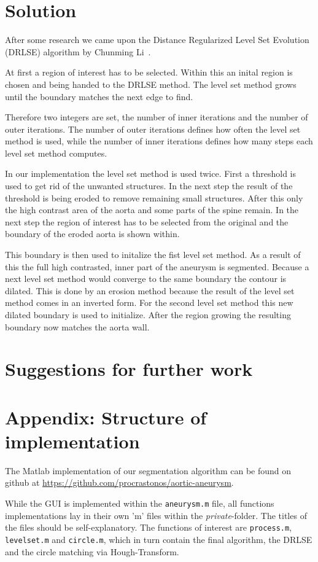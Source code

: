 \documentclass[a4paper]{scrartcl}
\begin{document}
\section*{Solution}

After some research we came upon the Distance Regularized Level Set Evolution
(DRLSE) algorithm by Chunming Li~\cite{Li_TIP08}.

At first a region of interest has to be selected. Within this an inital region is chosen and being handed to the DRLSE method.
The level set method grows until the boundary matches the next edge to find.

Therefore two integers are set, the number of inner iterations and the number of outer iterations.
The number of outer iterations defines how often the level set method is used, while the number of inner iterations defines how many steps each level set method computes.

In our implementation the level set method is used twice.
First a threshold is used to get rid of the unwanted structures.
In the next step the result of the threshold is being eroded to remove remaining small structures.
After this only the high contrast area of the aorta and some parts of the spine remain.
In the next step the region of interest has to be selected from the original and the boundary of the eroded aorta is shown within.

This boundary is then used to initalize the fist level set method.
As a result of this the full high contrasted, inner part of the aneurysm is segmented.
Because a next level set method would converge to the same boundary the contour is dilated. This is done by an erosion method because the result of the level set method comes in an inverted form.
For the second level set method this new dilated boundary is used to initialize.
After the region growing the resulting boundary now matches the aorta wall.

\section*{Suggestions for further work}

\section*{Appendix: Structure of implementation}

The Matlab implementation of our segmentation algorithm can be found on github
at \url{https://github.com/procrastonos/aortic-aneurysm}.

While the GUI is implemented within the \texttt{aneurysm.m} file, all functions
implementations lay in their own 'm' files within the \emph{private}-folder.
The titles of the files should be self-explanatory. The functions of interest
are \texttt{process.m}, \texttt{levelset.m} and \texttt{circle.m}, which in
turn contain the final algorithm, the DRLSE and the circle matching via
Hough-Transform.



\end{document}
